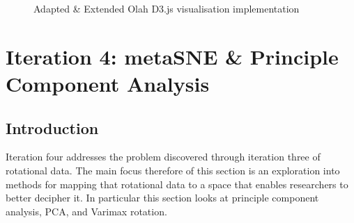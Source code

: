 \documentclass[a4paper,11pt,titlepage]{article}
\begin{document}
	\begin{figure}[H]
    			\caption{Adapted \& Extended Olah D3.js visualisation implementation}%
	\end{figure}	

	\clearpage 
	
\section{Iteration 4: metaSNE \& Principle Component Analysis}
	
	\subsection{Introduction}
	Iteration four addresses the problem discovered through iteration three of rotational data. The main focus therefore of this section is an exploration into methods for mapping that rotational data to a space that enables researchers to better decipher it. In particular this section looks at principle component analysis, PCA, and Varimax rotation. 
\end{document}
